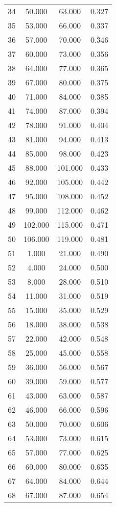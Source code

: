 \begin{tabular}{cccc}
  34 & 50.000 & 63.000 & 0.327 \\ 
  35 & 53.000 & 66.000 & 0.337 \\ 
  36 & 57.000 & 70.000 & 0.346 \\ 
  37 & 60.000 & 73.000 & 0.356 \\ 
  38 & 64.000 & 77.000 & 0.365 \\ 
  39 & 67.000 & 80.000 & 0.375 \\ 
  40 & 71.000 & 84.000 & 0.385 \\ 
  41 & 74.000 & 87.000 & 0.394 \\ 
  42 & 78.000 & 91.000 & 0.404 \\ 
  43 & 81.000 & 94.000 & 0.413 \\ 
  44 & 85.000 & 98.000 & 0.423 \\ 
  45 & 88.000 & 101.000 & 0.433 \\ 
  46 & 92.000 & 105.000 & 0.442 \\ 
  47 & 95.000 & 108.000 & 0.452 \\ 
  48 & 99.000 & 112.000 & 0.462 \\ 
  49 & 102.000 & 115.000 & 0.471 \\ 
  50 & 106.000 & 119.000 & 0.481 \\ 
  51 & 1.000 & 21.000 & 0.490 \\ 
  52 & 4.000 & 24.000 & 0.500 \\ 
  53 & 8.000 & 28.000 & 0.510 \\ 
  54 & 11.000 & 31.000 & 0.519 \\ 
  55 & 15.000 & 35.000 & 0.529 \\ 
  56 & 18.000 & 38.000 & 0.538 \\ 
  57 & 22.000 & 42.000 & 0.548 \\ 
  58 & 25.000 & 45.000 & 0.558 \\ 
  59 & 36.000 & 56.000 & 0.567 \\ 
  60 & 39.000 & 59.000 & 0.577 \\ 
  61 & 43.000 & 63.000 & 0.587 \\ 
  62 & 46.000 & 66.000 & 0.596 \\ 
  63 & 50.000 & 70.000 & 0.606 \\ 
  64 & 53.000 & 73.000 & 0.615 \\ 
  65 & 57.000 & 77.000 & 0.625 \\ 
  66 & 60.000 & 80.000 & 0.635 \\ 
  67 & 64.000 & 84.000 & 0.644 \\ 
  68 & 67.000 & 87.000 & 0.654 \\ 

\end{tabular}
